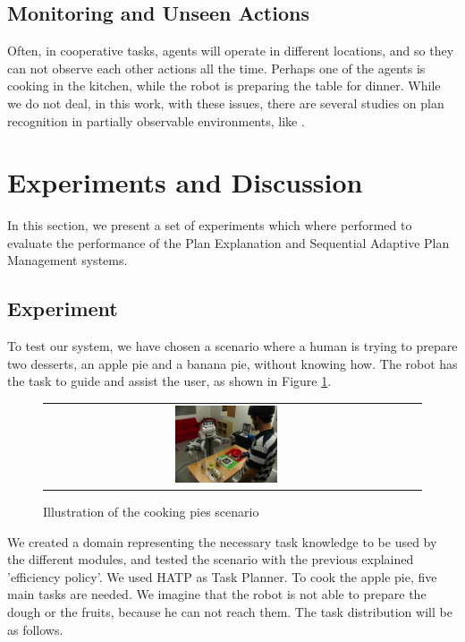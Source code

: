\subsection{Monitoring and Unseen Actions}
Often, in cooperative tasks, agents will operate in different locations, and so they can not observe each other actions all the time. Perhaps one of the agents is cooking in the kitchen,  while the robot is preparing the table for dinner. While we do not deal, in this work, with these issues, there are several studies on plan recognition in partially observable environments, like \cite{geib2005partial}.

\section{Experiments and Discussion}
\label{sec:plan_management-experiments}
In this section, we present a set of experiments which where performed to evaluate the performance of the Plan Explanation and Sequential Adaptive Plan Management systems.

 \subsection{Experiment}
 \label{sec:plan_management-experiment}
To test our system, we have chosen a scenario where a human is trying to prepare two desserts, an apple pie and a banana pie, without knowing how. The robot has the task to guide and assist the user, as shown in Figure \ref{fig:plan_management-scenario}. 

\begin{figure}[ht!]

 \centering
 \begin{tabular}{cc}
  \includegraphics[width=0.29\textwidth]{img/plan_management/scenario.JPG}
 \end{tabular}
 \caption{Illustration of the cooking pies scenario}
 \label{fig:plan_management-scenario}
 \end{figure}

We created a domain representing the necessary task knowledge to be used by the different modules, and tested the scenario with the previous explained 'efficiency policy'. We used HATP as Task Planner.
To cook the apple pie, five main tasks are needed. We imagine that the robot is not able to prepare the dough or the fruits, because he can not reach them. The task distribution will be as follows.

